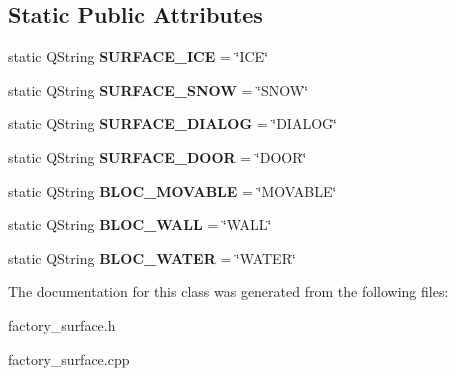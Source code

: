 \subsection*{Static Public Attributes}
\begin{DoxyCompactItemize}
\item 
\hypertarget{class_factory___surface_abd5bacb06b3aa404e8011e8d25626b13}{}static Q\+String {\bfseries S\+U\+R\+F\+A\+C\+E\+\_\+\+I\+C\+E} = \char`\"{}I\+C\+E\char`\"{}\label{class_factory___surface_abd5bacb06b3aa404e8011e8d25626b13}

\item 
\hypertarget{class_factory___surface_a8bbb2eeb0182af5fd302675bdfd06b3d}{}static Q\+String {\bfseries S\+U\+R\+F\+A\+C\+E\+\_\+\+S\+N\+O\+W} = \char`\"{}S\+N\+O\+W\char`\"{}\label{class_factory___surface_a8bbb2eeb0182af5fd302675bdfd06b3d}

\item 
\hypertarget{class_factory___surface_ad8893c40baacc04c83405ab47f110d2d}{}static Q\+String {\bfseries S\+U\+R\+F\+A\+C\+E\+\_\+\+D\+I\+A\+L\+O\+G} = \char`\"{}D\+I\+A\+L\+O\+G\char`\"{}\label{class_factory___surface_ad8893c40baacc04c83405ab47f110d2d}

\item 
\hypertarget{class_factory___surface_ad77044d144962f5348bac7d873687ae1}{}static Q\+String {\bfseries S\+U\+R\+F\+A\+C\+E\+\_\+\+D\+O\+O\+R} = \char`\"{}D\+O\+O\+R\char`\"{}\label{class_factory___surface_ad77044d144962f5348bac7d873687ae1}

\item 
\hypertarget{class_factory___surface_a00f8f75341d84c013f807508cfeb3283}{}static Q\+String {\bfseries B\+L\+O\+C\+\_\+\+M\+O\+V\+A\+B\+L\+E} = \char`\"{}M\+O\+V\+A\+B\+L\+E\char`\"{}\label{class_factory___surface_a00f8f75341d84c013f807508cfeb3283}

\item 
\hypertarget{class_factory___surface_a4c7a4f2f0b1740b52b6023b5730aacff}{}static Q\+String {\bfseries B\+L\+O\+C\+\_\+\+W\+A\+L\+L} = \char`\"{}W\+A\+L\+L\char`\"{}\label{class_factory___surface_a4c7a4f2f0b1740b52b6023b5730aacff}

\item 
\hypertarget{class_factory___surface_ad30fd833d02d4c18834829d1cd8b5317}{}static Q\+String {\bfseries B\+L\+O\+C\+\_\+\+W\+A\+T\+E\+R} = \char`\"{}W\+A\+T\+E\+R\char`\"{}\label{class_factory___surface_ad30fd833d02d4c18834829d1cd8b5317}

\end{DoxyCompactItemize}


The documentation for this class was generated from the following files\+:\begin{DoxyCompactItemize}
\item 
factory\+\_\+surface.\+h\item 
factory\+\_\+surface.\+cpp\end{DoxyCompactItemize}
